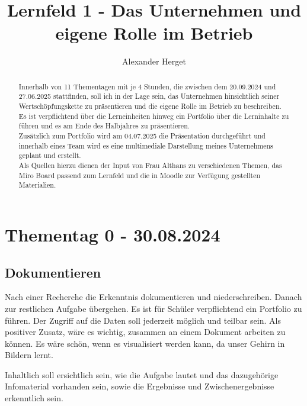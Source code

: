 \documentclass[]{article}
\title{Lernfeld 1 - Das Unternehmen und eigene Rolle im Betrieb}
\author{Alexander Herget}
\begin{document}
	
\maketitle
	
\begin{abstract}

Innerhalb von 11 Thementagen mit je 4 Stunden, die zwischen dem 20.09.2024 und 27.06.2025 stattfinden, soll ich in der Lage sein, das Unternehmen hinsichtlich seiner Wertschöpfungskette zu präsentieren und die eigene Rolle im Betrieb zu beschreiben. \\

Es ist verpflichtend über die Lerneinheiten hinweg ein Portfolio über die Lerninhalte zu führen und es am Ende des Halbjahres zu präsentieren.\\

Zusätzlich zum Portfolio wird am 04.07.2025 die Präsentation durchgeführt und innerhalb eines Team wird es eine multimediale Darstellung meines Unternehmens geplant und erstellt.\\

Als Quellen hierzu dienen der Input von Frau Althans zu verschiedenen Themen, das Miro Board passend zum Lernfeld und die in Moodle zur Verfügung gestellten Materialien.

\end{abstract}

\newpage
\tableofcontents

\newpage	
\section{Thementag 0 - 30.08.2024}

\subsection{Dokumentieren}

Nach einer Recherche die Erkenntnis dokumentieren und niederschreiben. Danach zur restlichen Aufgabe übergehen. Es ist für Schüler verpflichtend ein Portfolio zu führen. Der Zugriff auf die Daten soll jederzeit möglich und teilbar sein. Als positiver Zusatz, wäre es wichtig, zusammen an einem Dokument arbeiten zu können. Es wäre schön, wenn es visualisiert werden kann, da unser Gehirn in Bildern lernt.

Inhaltlich soll ersichtlich sein, wie die Aufgabe lautet und das dazugehörige Infomaterial vorhanden sein, sowie die Ergebnisse und Zwischenergebnisse erkenntlich sein.
	
\end{document}

